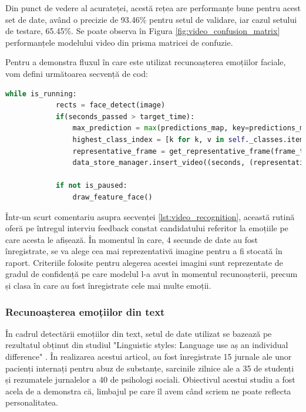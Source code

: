 \documentclass[a4paper, 12pt]{report}
\begin{document}
	Din punct de vedere al acurateței, acestă rețea are performanțe bune pentru acest set de date, având o precizie de 93.46\% pentru setul de validare, iar cazul setului de testare,  65.45\%. Se poate observa în Figura \ref{fig:video_confusion_matrix} performanțele modelului video din prisma matricei de confuzie.
	
	Pentru a demonstra fluxul în care este utilizat recunoașterea emoțiilor faciale, vom defini următoarea secvență de cod:
	
	\begin{lstlisting}[language=python, caption=Execuție recunoaștere emoțiilor faciale, label=lst:video_recognition]
		while is_running:
			rects = face_detect(image)
			if(seconds_passed > target_time):
				max_prediction = max(predictions_map, key=predictions_map.get)
				highest_class_index = [k for k, v in self._classes.items() if v == max_prediction][0]
				representative_frame = get_representative_frame(frame_to_predictions, highest_class_index)
				data_store_manager.insert_video((seconds, (representative_frame, max_prediction)))
				
			if not is_paused:	
				draw_feature_face()
	\end{lstlisting}
	
	Într-un scurt comentariu asupra secvenței \ref{lst:video_recognition}, această rutină oferă pe întregul interviu feedback constat candidatului referitor la emoțiile pe care acesta le afișează. În momentul în care, 4 secunde de date au fost înregistrate, se va alege cea mai reprezentativă imagine pentru a fi stocată în raport. Criteriile folosite pentru alegerea acestei imagini sunt reprezentate de gradul de confidență pe care modelul l-a avut în momentul recunoașterii, precum și clasa în care au fost înregistrate cele mai multe emoții.
	
	\clearpage
	\subsubsection{Recunoașterea emoțiilor din text}
	În cadrul detectării emoțiilor din text, setul de date utilizat se bazează pe rezultatul obținut din studiul "Linguistic styles: Language use aș an individual difference" \cite{text_dataset}. În realizarea acestui articol, au fost înregistrate 15 jurnale ale unor pacienți internați pentru abuz de substanțe, sarcinile zilnice ale a 35 de studenți și rezumatele jurnalelor a 40 de psihologi sociali. Obiectivul acestui studiu a fost acela de a demonstra că, limbajul pe care îl avem când scriem ne poate reflecta personalitatea.
\end{document}
